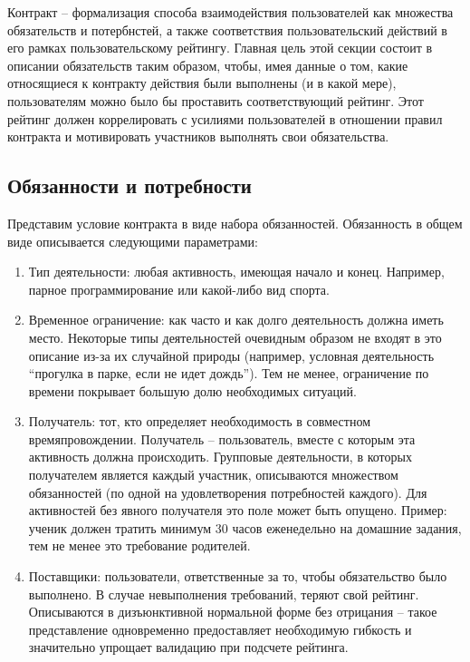 \documentclass[specification,annotation]{itmo-student-thesis}
\begin{document}
Контракт -- формализация способа взаимодействия пользователей как
множества обязательств и потербнстей, а также соответствия
пользовательский действий в его рамках пользовательскому
рейтингу. Главная цель этой секции состоит в описании обязательств
таким образом, чтобы, имея данные о том, какие относящиеся к контракту
действия были выполнены (и в какой мере), пользователям можно было бы
проставить соответствующий рейтинг. Этот рейтинг должен коррелировать
с усилиями пользователей в отношении правил контракта и мотивировать
участников выполнять свои обязательства.

\subsection{Обязанности и потребности}

Представим условие контракта в виде набора обязанностей. Обязанность в
общем виде описывается следующими параметрами:

\begin{enumerate}
\item Тип деятельности: любая активность, имеющая начало и
  конец. Например, парное программирование или какой-либо вид спорта.
\item Временное ограничение: как часто и как долго деятельность должна
  иметь место. Некоторые типы деятельностей очевидным образом не
  входят в это описание из-за их случайной природы (например, условная
  деятельность ``прогулка в парке, если не идет дождь''). Тем не
  менее, ограничение по времени покрывает большую долю необходимых
  ситуаций.
\item Получатель: тот, кто определяет необходимость в совместном
  времяпровождении. Получатель -- пользователь, вместе с которым эта
  активность должна происходить. Групповые деятельности, в которых
  получателем является каждый участник, описываются множеством
  обязанностей (по одной на удовлетворения потребностей каждого). Для
  активностей без явного получателя это поле может быть
  опущено. Пример: ученик должен тратить минимум 30 часов еженедельно
  на домашние задания, тем не менее это требование родителей.
\item Поставщики: пользователи, ответственные за то, чтобы
  обязательство было выполнено. В случае невыполнения требований,
  теряют свой рейтинг. Описываются в дизъюнктивной нормальной форме
  без отрицания -- такое представление одновременно предоставляет
  необходимую гибкость и значительно упрощает валидацию при подсчете
  рейтинга.
\end{enumerate}
\end{document}
